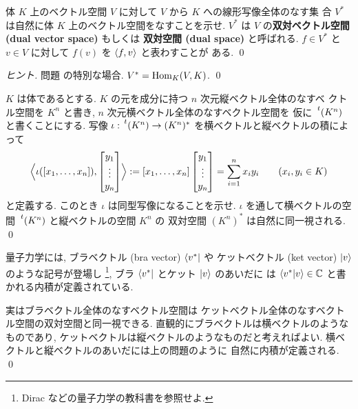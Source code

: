 \documentclass[12pt,twoside]{jarticle}
\begin{document}

\begin{question}[双対空間の定義, 5点]
  体 $K$ 上のベクトル空間 $V$ に対して $V$ から $K$ への線形写像全体のなす集
  合 $V^*$ は自然に体 $K$ 上のベクトル空間をなすことを示せ.
  $V^*$ は $V$ の{\bf 双対ベクトル空間 (dual vector space)} もしくは
  {\bf 双対空間 (dual space)} と呼ばれる.
  $f\in V^*$ と $v\in V$ に対して $f(v)$ を $\langle f,v\rangle$ と表わすことが
  ある.
  \qed
\end{question}

\begin{proof}[ヒント]
  問題  の特別な場合. $V^*=\mathop{\mathrm{Hom}}\nolimits_K(V,K)$. \qed
\end{proof}


\begin{question}[横ベクトルの空間と縦ベクトルの空間の双対性, 5点]
  $K$ は体であるとする. $K$ の元を成分に持つ $n$ 次元縦ベクトル全体のなすベ
  クトル空間を $K^n$ と書き, $n$ 次元横ベクトル全体のなすベクトル空間を
  仮に $\tp{(K^n)}$ と書くことにする.
  写像 $\iota:\tp{(K^n)}\to(K^n)^*$ を横ベクトルと縦ベクトルの積によって
  \begin{equation*}
    \Bigl\langle
    \iota([x_1,\ldots,x_n]), 
    \begin{bmatrix}
      y_1 \\ \vdots \\ y_n \\
    \end{bmatrix}
    \Bigr\rangle
    := 
    [x_1,\ldots,x_n]
    \begin{bmatrix}
      y_1 \\ \vdots \\ y_n \\
    \end{bmatrix}
    = \sum_{i=1}^n x_iy_i
    \qquad (x_i,y_i\in K)
  \end{equation*}
  と定義する. このとき $\iota$ は同型写像になることを示せ.
  $\iota$ を通して横ベクトルの空間 $\tp{(K^n)}$ と縦ベクトルの空間 $K^n$ の
  双対空間 $(K^n)^*$ は自然に同一視される.
  \qed
\end{question}

\begin{guide}[ブラとケット]
  \label{guide:bra-ket}
  量子力学には, ブラベクトル (bra vector) $\langle v^*|$ や
  ケットベクトル (ket vector) $|v\rangle$ のような記号が登場し%
  \footnote{Dirac \cite{Dirac} などの量子力学の教科書を参照せよ.},
  ブラ $\langle v^*|$ とケット $|v\rangle$ のあいだに
  は $\langle v^*|v\rangle\in{\mathbb C}$ と書かれる内積が定義されている.

  実はブラベクトル全体のなすベクトル空間は
  ケットベクトル全体のなすベクトル空間の双対空間と同一視できる.
  直観的にブラベクトルは横ベクトルのようなものであり,
  ケットベクトルは縦ベクトルのようなものだと考えればよい.
  横ベクトルと縦ベクトルのあいだには上の問題のように
  自然に内積が定義される.
  \qed
\end{guide}
\end{document}
